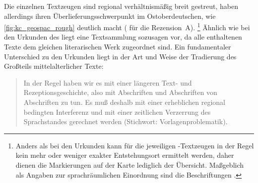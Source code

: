 Die einzelnen Textzeugen sind regional verhältnismäßig breit gestreut, haben
allerdings ihren Überlieferungsschwerpunkt im Ostoberdeutschen, wie
\cref{fig:kc_geospac_rough} deutlich macht
(\cite[vgl.~auch][]{klein1988} für die Rezension~A).%
%
	\footnote{Anders als bei den Urkunden kann für die jeweiligen
		\KC{}-Textzeugen in der Regel kein mehr oder weniger exakter
		Entstehungsort ermittelt werden, daher dienen die Markierungen auf der
		Karte lediglich der Übersicht. Maßgeblich als Angaben zur
		sprachräumlichen Einordnung sind die Beschriftungen
		\autocite[vgl.][]{wolf:kckat}.}
%
Ähnlich wie bei den Urkunden des \CAO{} liegt eine Textsammlung
sozusagen  vor, da alle enthaltenen Texte dem gleichen
literarischen Werk zugeordnet sind. Ein fundamentaler Unterschied zu den
Urkunden liegt in der Art und Weise der Tradierung des Großteils
mittelalterlicher Texte: \blockquote[{\cites[1310]{wegera2000}[siehe
auch][262--263]{fleischer2019}}]{In der Regel haben wir es mit einer längeren
Text- und Rezeptionsgeschichte, also mit Abschriften und Abschriften von
Abschriften zu tun. Es muß deshalb mit einer erheblichen regional bedingten
Interferenz und mit einer zeitlichen Verzerrung des Sprachstandes gerechnet
werden (Stichwort: Vorlagenproblematik).}

